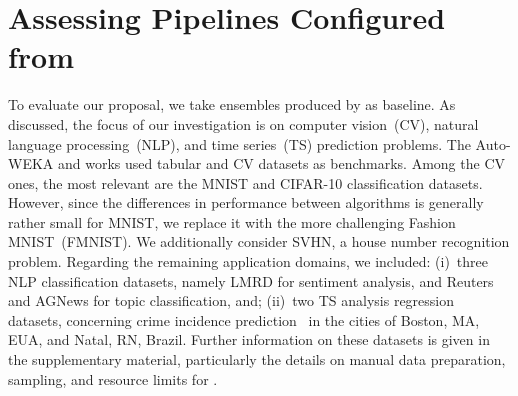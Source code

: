 \section{Assessing Pipelines Configured from \isklearn}
\label{sec:results}

To evaluate our proposal, we take ensembles produced by \autosklearn as baseline. As discussed, the focus of our investigation is on computer vision~(CV), natural language processing~(NLP), and time series~(TS) prediction problems. The Auto-WEKA and \autosklearn works used tabular and CV datasets as benchmarks. Among the CV ones, the most relevant are 
the MNIST and CIFAR-10 classification datasets. However, since the differences in performance between algorithms is generally rather small for MNIST, we replace it with the more challenging Fashion MNIST~(FMNIST). We additionally consider SVHN, a house number recognition problem. Regarding the remaining application domains, we included: (i)~three NLP classification datasets, namely LMRD for sentiment analysis, and Reuters and AGNews for topic classification, and; (ii)~two TS analysis regression datasets, concerning crime incidence prediction~\cite{kounadi2020systematic} in the cities of Boston, MA, EUA, and Natal, RN, Brazil. Further information on these datasets is given in the supplementary material, particularly the details on manual data preparation, sampling, and resource limits for \autosklearn.


